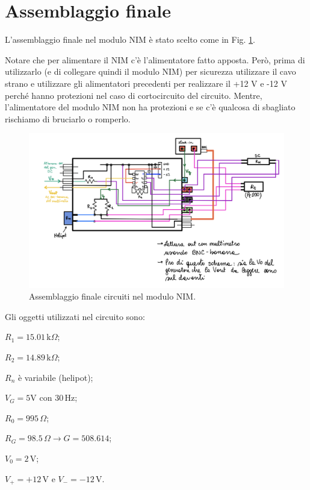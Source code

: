 \documentclass[../main/main.tex]{subfiles}
\begin{document}
\section{Assemblaggio finale}

L'assemblaggio finale nel modulo NIM è stato scelto come in Fig. \ref{fig:08_2}.

Notare che per alimentare il NIM c'è l'alimentatore fatto apposta. Però, prima di utilizzarlo (e di collegare quindi il modulo NIM) per sicurezza utilizzare il cavo strano e utilizzare gli alimentatori precedenti per realizzare il +12 V e -12 V perché hanno protezioni nel caso di cortocircuito del circuito. Mentre, l'alimentatore del modulo NIM non ha protezioni e se c'è qualcosa di sbagliato rischiamo di bruciarlo o romperlo.

\begin{figure}[h!]
\centering
\includegraphics[width=1\textwidth]{../lessons/image/08/3.png}
\caption{\label{fig:08_2} Assemblaggio finale circuiti nel modulo NIM.}
\end{figure}


Gli oggetti utilizzati nel circuito sono:
\begin{itemize}

\begin{minipage}[c]{0.5\linewidth}
\item \( R_1 =  15.01 \, \text{k}\Omega \);
\item \( R_2 = 14.89 \, \text{k}\Omega  \);
\item \( R_n \) è variabile (helipot);
\item \( V_G = 5 \text{V}\) con \(30\,\text{Hz} \);
\end{minipage}
\begin{minipage}[]{0.5\linewidth}
\item \( R_0 = 995 \, \Omega  \);
\item \( R_G = 98.5 \, \Omega  \rightarrow G=508.614 \);
\item \( V_0 = 2 \, \text{V} \);
\item \( V_+ = +12 \, \text{V} \) e \( V_- = -12 \, \text{V} \).
\end{minipage}

\end{itemize}
\end{document}
